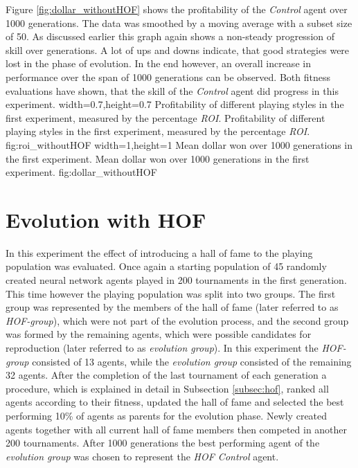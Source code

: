 Figure \ref{fig:dollar_withoutHOF} shows the profitability of the \textit{Control} agent over 1000 generations. The data was smoothed by a moving average with a subset size of 50. As discussed earlier this graph again shows a non-steady progression of skill over generations. A lot of ups and downs indicate, that good strategies were lost in the phase of evolution. In the end however, an overall increase in performance over the span of 1000 generations can be observed. Both fitness evaluations have shown, that the skill of the \textit{Control} agent did progress in this experiment.
  {width=0.7\textwidth,height=0.7\textheight}%
  {Profitability of different playing styles in the first experiment, measured by the percentage \textit{ROI}.}%
  {Profitability of different playing styles in the first experiment, measured by the percentage \textit{ROI}.}%
  {fig:roi_withoutHOF}%
  {width=1\textwidth,height=1\textheight}%
  {Mean dollar won over 1000 generations in the first experiment.}%
  {Mean dollar won over 1000 generations in the first experiment.}%
  {fig:dollar_withoutHOF}%
  \pagebreak
\section{Evolution with HOF}
In this experiment the effect of introducing a hall of fame to the playing population was evaluated. Once again a starting population of 45 randomly created neural network agents played in 200 tournaments in the first generation. This time however the playing population was split into two groups. The first group was represented by the members of the hall of fame (later referred to as \textit{HOF-group}), which were not part of the evolution process, and the second group was formed by the remaining agents, which were possible candidates for reproduction (later referred to as \textit{evolution group}). In this experiment the \textit{HOF-group} consisted of 13 agents, while the \textit{evolution group} consisted of the remaining 32 agents. After the completion of the last tournament of each generation a procedure, which is explained in detail in Subsection \ref{subsec:hof}, ranked all agents according to their fitness, updated the hall of fame and selected the best performing 10\% of agents as parents for the evolution phase. Newly created agents together with all current hall of fame members then competed in another 200 tournaments. After 1000 generations the best performing agent of the \textit{evolution group} was chosen to represent the \textit{HOF Control} agent.
